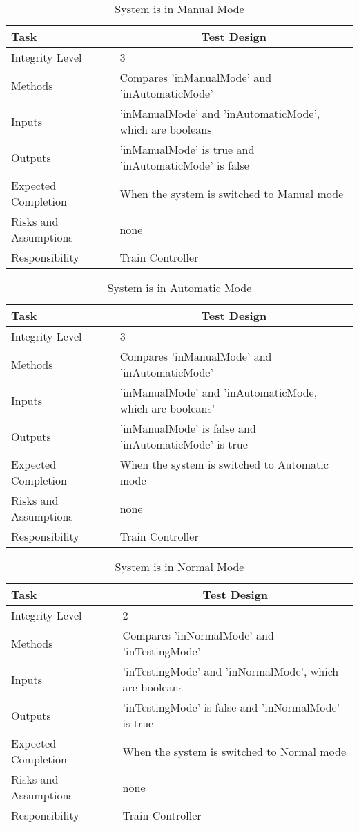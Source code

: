 \documentclass[]{article}
\begin{document}
\begin{table}[H]
	\centering
	\caption{System is in Manual Mode}
	\begin{tabular}{|l|l|}
		\hline
		Task & \multicolumn{1}{c|}{Test Design} \\ \hline
		Integrity Level & 3 \\ \hline
		Methods & Compares 'inManualMode' and 'inAutomaticMode'\\ \hline
		Inputs & 'inManualMode' and 'inAutomaticMode', which are booleans\\ \hline
		Outputs & 'inManualMode' is true and 'inAutomaticMode' is false \\ \hline
		Expected Completion & When the system is switched to Manual mode\\ \hline
		Risks and Assumptions & none\\ \hline
		Responsibility & Train Controller\\ \hline
	\end{tabular}
\end{table}

\begin{table}[H]
	\centering
	\caption{System is in Automatic Mode}
	\begin{tabular}{|l|l|}
		\hline
		Task & \multicolumn{1}{c|}{Test Design} \\ \hline
		Integrity Level & 3 \\ \hline
		Methods & Compares 'inManualMode' and 'inAutomaticMode'\\ \hline
		Inputs & 'inManualMode' and 'inAutomaticMode, which are booleans'\\ \hline
		Outputs & 'inManualMode' is false and 'inAutomaticMode' is true \\ \hline
		Expected Completion & When the system is switched to Automatic mode\\ \hline
		Risks and Assumptions & none\\ \hline
		Responsibility & Train Controller\\ \hline
	\end{tabular}
\end{table}

\begin{table}[H]
	\centering
	\caption{System is in Normal Mode}
	\begin{tabular}{|l|l|}
		\hline
		Task & \multicolumn{1}{c|}{Test Design} \\ \hline
		Integrity Level & 2\\ \hline
		Methods & Compares 'inNormalMode' and 'inTestingMode'\\ \hline
		Inputs & 'inTestingMode' and 'inNormalMode', which are booleans\\ \hline
		Outputs & 'inTestingMode' is false and 'inNormalMode' is true \\ \hline
		Expected Completion & When the system is switched to Normal mode\\ \hline
		Risks and Assumptions & none\\ \hline
		Responsibility & Train Controller\\ \hline
	\end{tabular}
\end{table}
\end{document}
